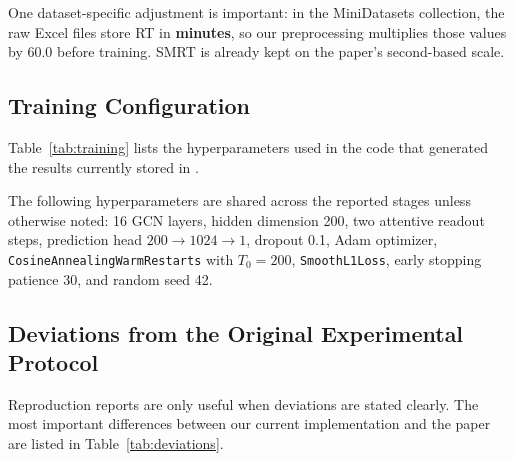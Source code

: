 One dataset-specific adjustment is important: in the MiniDatasets collection, the raw Excel files store RT in \textbf{minutes}, so our preprocessing multiplies those values by \(60.0\) before training. SMRT is already kept on the paper's second-based scale.

\subsection{Training Configuration}

Table~\ref{tab:training} lists the hyperparameters used in the code that generated the results currently stored in .

\begin{table}[t]
    \centering
    \caption{Training settings used for the runs reported in this report. The MiniDataset stage uses direct SMRT-initialized transfer learning under a single shuffled split.}
    \label{tab:training}
\end{table}

The following hyperparameters are shared across the reported stages unless otherwise noted: 16 GCN layers, hidden dimension 200, two attentive readout steps, prediction head \(200 \rightarrow 1024 \rightarrow 1\), dropout 0.1, Adam optimizer, \texttt{CosineAnnealingWarmRestarts} with \(T_0 = 200\), \texttt{SmoothL1Loss}, early stopping patience 30, and random seed 42.

\subsection{Deviations from the Original Experimental Protocol}

Reproduction reports are only useful when deviations are stated clearly. The most important differences between our current implementation and the paper are listed in Table~\ref{tab:deviations}.

